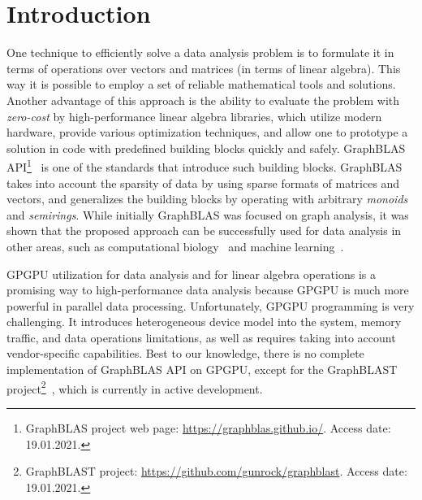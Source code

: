 \section{Introduction}

One technique to efficiently solve a data analysis problem is to formulate it in terms of operations over vectors and matrices (in terms of linear algebra).
This way it is possible to employ a set of reliable mathematical tools and solutions.
Another advantage of this approach is the ability to evaluate the problem with \textit{zero-cost} by high-performance linear algebra libraries, which utilize modern hardware, provide various optimization techniques, and allow one to prototype a solution in code with predefined building blocks quickly and safely.
GraphBLAS API\footnote{GraphBLAS project web page: \url{https://graphblas.github.io/}. Access date: 19.01.2021.}~\cite{7761646} is one of the standards that introduce such building blocks.
GraphBLAS takes into account the sparsity of data by using sparse formats of matrices and vectors, and generalizes the building blocks by operating with arbitrary \textit{monoids} and \textit{semirings}.
While initially GraphBLAS was focused on graph analysis, it was shown that the proposed approach can be successfully used for data analysis in other areas, such as computational biology~\cite{10.5555/3433701.3433800} and machine learning~\cite{8091098}.

GPGPU utilization for data analysis and for linear algebra operations is a promising way to high-performance data analysis because GPGPU is much more powerful in parallel data processing.
Unfortunately, GPGPU programming is very challenging.
It introduces heterogeneous device model into the system, memory traffic, and data operations limitations, as well as requires taking into account vendor-specific capabilities.
Best to our knowledge, there is no complete implementation of GraphBLAS API on GPGPU, except for the GraphBLAST project\footnote{GraphBLAST project: \url{https://github.com/gunrock/graphblast}. Access date: 19.01.2021.}~\cite{yang2019graphblast}, which is currently in active development.

